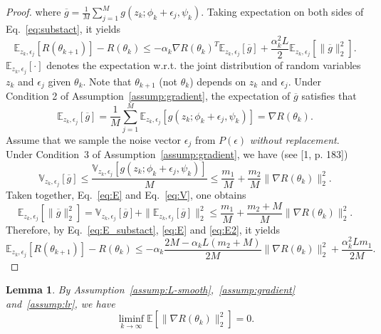 \documentclass{article}
\newtheorem{lemma}{Lemma}[section]
\begin{document}
\begin{proof}
where $\overline{g}=\frac{1}{M}\sum_{j=1}^{M}g(z_k;\phi_k +\epsilon_j, \psi_k)$. Taking expectation on both sides of Eq.~\ref{eq:substact}, it yields
\begin{equation}\label{eq:E_substact}
    \mathbb{E}_{z_k,\epsilon_{j}}[R(\theta_{k+1})] - R(\theta_k) \leq - \alpha_k\nabla R(\theta_k)^{T}\mathbb{E}_{z_k,\epsilon_{j}}[\overline{g}] + \frac{\alpha_k^2 L}{2}\mathbb{E}_{z_k,\epsilon_{j}}[\|\overline{g}\|_2^2].
\end{equation}
$\mathbb{E}_{z_{k},\epsilon_j}[\cdot]$ denotes the expectation w.r.t. the joint distribution of random variables $z_k$ and $\epsilon_j$ given $\theta_k$. Note that $\theta_{k+1}$ (not $\theta_k$) depends on $z_k$ and $\epsilon_j$. Under Condition 2 of Assumption~\ref{assump:gradient}, the expectation of $\overline{g}$ satisfies that
\begin{equation}\label{eq:E}
    \mathbb{E}_{z_k,\epsilon_{j}}[\overline{g}] = \frac{1}{M}\sum_{j=1}^{M}\mathbb{E}_{z_k,\epsilon_{j}}[g(z_k;\phi_k +\epsilon_j, \psi_k)] = \nabla R(\theta_k).
\end{equation}
Assume that we sample the noise vector $\epsilon_j$ from $P(\epsilon)$ \emph{without replacement}. Under Condition~3 of Assumption~\ref{assump:gradient}, we have (see [1, p. 183])
\begin{equation}\label{eq:V}
    \mathbb{V}_{z_{k},\epsilon_j}[\overline{g}] \leq \frac{ \mathbb{V}_{z_{k},\epsilon_j}[g(z_k;\phi_k +\epsilon_j, \psi_k)]}{M} \leq \frac{m_1}{M} + \frac{m_2}{M}\|\nabla R(\theta_k)\|_2^2. 
\end{equation}
Taken together,  Eq.~\ref{eq:E} and Eq.~\ref{eq:V}, one obtains
\begin{equation}\label{eq:E2}
    \mathbb{E}_{z_k,\epsilon_{j}}[\|\overline{g}\|_2^2] = \mathbb{V}_{z_{k},\epsilon_j}[\overline{g}] + \|\mathbb{E}_{z_k,\epsilon_{j}}[\overline{g}]\|_2^2 \leq \frac{m_1}{M} + \frac{m_2+M}{M}\|\nabla R(\theta_k)\|_2^2. 
\end{equation}
Therefore, by Eq.~\ref{eq:E_substact}, \ref{eq:E} and \ref{eq:E2}, it yields
\begin{equation}
    \mathbb{E}_{z_k,\epsilon_{j}}[R(\theta_{k+1})] - R(\theta_k) \leq -\alpha_k\frac{2M-\alpha_k L(m_2+M)}{2M}\|\nabla R(\theta_k)\|_2^2  + \frac{\alpha_k^2L m_1}{2M}.
\end{equation}
\end{proof}

\begin{lemma}\label{lemma:liminf}
By Assumption~\ref{assump:L-smooth},~\ref{assump:gradient} and~\ref{assump:lr}, we have
\begin{equation}
    \liminf_{k\to\infty}\mathbb{E}[\|\nabla R(\theta_k)\|_2^2]=0.
\end{equation}
\end{lemma}
\end{document}
